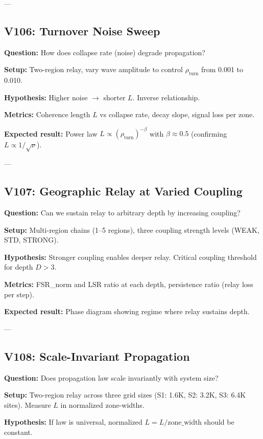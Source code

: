\documentclass[11pt]{article}
\begin{document}
---

\subsection{V106: Turnover Noise Sweep}

\textbf{Question:} How does collapse rate (noise) degrade propagation?

\textbf{Setup:} Two-region relay, vary wave amplitude to control $\rho_{\text{turn}}$ from 0.001 to 0.010.

\textbf{Hypothesis:} Higher noise $\rightarrow$ shorter $L$. Inverse relationship.

\textbf{Metrics:} Coherence length $L$ vs collapse rate, decay slope, signal loss per zone.

\textbf{Expected result:} Power law $L \propto (\rho_{\text{turn}})^{-\beta}$ with $\beta \approx 0.5$ (confirming $L \propto 1/\sqrt{\nu}$).

---

\subsection{V107: Geographic Relay at Varied Coupling}

\textbf{Question:} Can we sustain relay to arbitrary depth by increasing coupling?

\textbf{Setup:} Multi-region chains (1--5 regions), three coupling strength levels (WEAK, STD, STRONG).

\textbf{Hypothesis:} Stronger coupling enables deeper relay. Critical coupling threshold for depth $D > 3$.

\textbf{Metrics:} FSR\_norm and LSR ratio at each depth, persistence ratio (relay loss per step).

\textbf{Expected result:} Phase diagram showing regime where relay sustains depth.

---

\subsection{V108: Scale-Invariant Propagation}

\textbf{Question:} Does propagation law scale invariantly with system size?

\textbf{Setup:} Two-region relay across three grid sizes (S1: 1.6K, S2: 3.2K, S3: 6.4K sites). Measure $L$ in normalized zone-widths.

\textbf{Hypothesis:} If law is universal, normalized $L = L / \text{zone\_width}$ should be constant.
\end{document}
